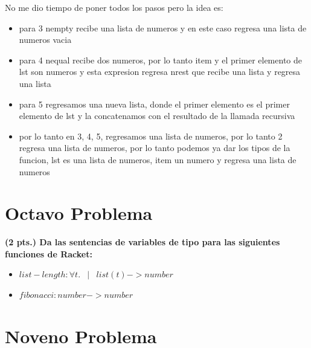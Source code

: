 \documentclass[journal,12pt,onecolumn]{IEEEtran}                %
\DeclareMathOperator \Space     {\quad}                         %
\DeclareMathOperator \MiniSpace {\;}                            %
\newcommand \Such           {\MiniSpace | \MiniSpace}           %
\theoremstyle{break}                                            %
\begin{document}
      No me dio tiempo de poner todos los pasos pero la idea es:
      \begin{itemize}
        \item para 3 nempty recibe una lista de numeros y en este caso regresa
        una lista de numeros vacia

        \item para 4 nequal recibe dos numeros, por lo tanto item y el primer
        elemento de lst son numeros y esta expresion regresa nrest que recibe una lista
        y regresa una lista
        \item para 5 regresamos una nueva lista, donde el primer elemento es el
        primer elemento de lst y la concatenamos con el resultado de la llamada recursiva

        \item por lo tanto en 3, 4, 5, regresamos una lista de numeros, por lo tanto 2 regresa
        una lista de numeros, por lo tanto podemos ya dar los tipos de la funcion, lst es una lista
        de numeros, item un numero y regresa una lista de numeros
      \end{itemize}


    \section*{Octavo Problema}

    \textbf{
    (2 pts.) Da las sentencias de variables de tipo para las siguientes funciones de Racket:
    }
    \begin{itemize}
      \item $list-length: \forall t. \Such list(t) -> number$ 
      \item $fibonacci: number -> number$ 
    \end{itemize}

    \section*{Noveno Problema}
\end{document}

